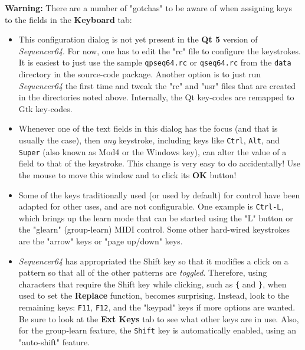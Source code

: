    \textbf{Warning:}
   There are a number of "gotchas" to be aware of when assigning keys to the
   fields in the \textbf{Keyboard} tab:

   \begin{itemize}
      \item This configuration dialog is not yet present in the
         \textbf{Qt 5} version of \textsl{Sequencer64}.  For now,
         one has to edit the "rc" file to configure the keystrokes.
         It is easiest to just use the sample \texttt{qpseq64.rc}
         or \texttt{qseq64.rc} from the
         \texttt{data} directory in the source-code package.
         Another option is to just run \textsl{Sequencer64} the first time and
         tweak the "rc" and "usr" files that are created in the directories
         noted above.
         Internally, the Qt key-codes are remapped to Gtk key-codes.
      \item Whenever one of the text fields in this dialog has the focus (and
         that is usually the case), then
         \textsl{any} keystroke, including keys like
         \texttt{Ctrl},
         \texttt{Alt}, and
         \texttt{Super} (also known as Mod4 or the Windows key),
         can alter the value of a
         field to that of the keystroke.  This change is very easy to do
         accidentally!  \textsf{Use the mouse} to move this window and to click
         its \textbf{OK} button!
      \item Some of the keys traditionally used (or used by default) for
         control have been adapted for other uses, and are not configurable.
         One example is \texttt{Ctrl-L}, which brings up the learn mode
         that can be started using the "L" button or the "glearn"
         (group-learn) MIDI control.
         Some other hard-wired keystrokes are the "arrow" keys or "page
         up/down" keys.
      \item \textsl{Sequencer64} has appropriated the
          Shift key so that it
         modifies a click on a pattern so that all of the other patterns are
         \textsl{toggled}.  Therefore, using characters that require the Shift
         key while clicking, such as \texttt{\{} and \texttt{\}}, when used
         to set the \textbf{Replace} function, becomes surprising.
         Instead, look to the remaining keys: \texttt{F11}, \texttt{F12},
         and the "keypad" keys if more options are wanted.  Be sure to
         look at the \textbf{Ext Keys} tab to see what other keys are in use.
         Also, for the group-learn feature, the \texttt{Shift} key is 
         automatically enabled, using an "auto-shift" feature.
   \end{itemize}

